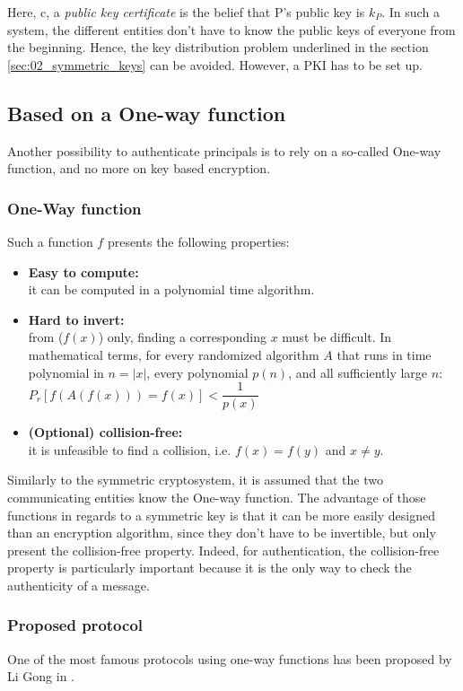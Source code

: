 Here, c, a \emph{public key certificate} is the belief that P's public key is $k_{P}$. In such a system, the different entities don't have to know the public keys of everyone from the beginning. Hence, the key distribution problem underlined in the section \ref{sec:02_symmetric_keys} can be avoided. However, a PKI has to be set up.

\subsection{Based on a One-way function}
Another possibility to authenticate principals is to rely on a so-called One-way function, and no more on key based encryption.

\subsubsection{One-Way function}
Such a function $f$ presents the following properties:
\begin{itemize}
	\item \textbf{Easy to compute:} \\
	it can be computed in a polynomial time algorithm.
	\item \textbf{Hard to invert:} \\
	from ($f(x)$) only, finding a corresponding $x$ must be difficult. In mathematical terms,  for every randomized algorithm $A$ that runs in time polynomial in $n=|x|$, every polynomial $p(n)$, and all sufficiently large $n$: \\
	$ P_{r}[f(A(f(x))) = f(x)] < \dfrac{1}{p(x)}$ 
	\item \textbf{(Optional) collision-free:} \\
	it is unfeasible to find a collision, i.e. $f(x) = f(y)$ and $x \ne y$.
\end{itemize}

Similarly to the symmetric cryptosystem, it is assumed that the two communicating entities know the One-way function. The advantage of those functions in regards to a symmetric key is that it can be more easily designed than an encryption algorithm, since they don't have to be invertible, but only present the collision-free property. Indeed, for authentication, the collision-free property is particularly important because it is the only way to check the authenticity of a message.

\subsubsection{Proposed protocol}
One of the most famous protocols using one-way functions has been proposed by Li Gong\cite{Gong1989} in .

